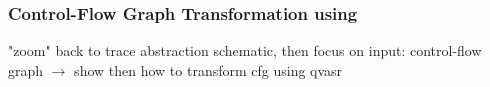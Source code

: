 \begin{frame}[t]
	\frametitle{Control-Flow Graph Transformation using \qvasr}
	"zoom" back to trace abstraction schematic, then focus on input: control-flow graph $\rightarrow$ show then how to transform cfg using qvasr
\end{frame}